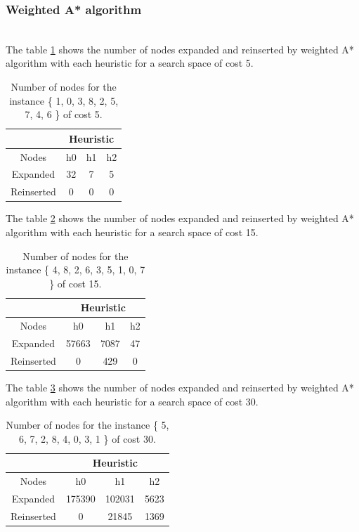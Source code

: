 \documentclass[runningheads]{llncs}
\begin{document}
\subsubsection{Weighted A* algorithm}~\\

The table \ref{tab:table4} shows the number of nodes expanded and reinserted by weighted A* algorithm with each heuristic for a search space of cost 5.
\begin{table}
    \centering
\caption{\label{tab:table4}Number of nodes for the instance \{ 1, 0, 3, 8, 2, 5, 7, 4, 6 \} of cost 5.}
    \begin{tabular}{|c|c|c|c|}
    \hline
       & \multicolumn{3}{|c|}{Heuristic} \\ \hline
        Nodes & h0 & h1 & h2 \\ \hline
        Expanded & 32 & 7 & 5 \\ \hline
        Reinserted & 0 & 0 & 0 \\ \hline
    \end{tabular}
\end{table}

The table \ref{tab:table5} shows the number of nodes expanded and reinserted by weighted A* algorithm with each heuristic for a search space of cost 15.
\begin{table}
    \centering
\caption{\label{tab:table5}Number of nodes for the instance \{ 4, 8, 2, 6, 3, 5, 1, 0, 7 \} of cost 15.}
    \begin{tabular}{|c|c|c|c|}
    \hline
       & \multicolumn{3}{|c|}{Heuristic} \\ \hline
        Nodes & h0 & h1 & h2 \\ \hline
        Expanded & 57663 & 7087 & 47 \\ \hline
        Reinserted & 0 & 429 & 0 \\ \hline
    \end{tabular}
\end{table}

The table \ref{tab:table6} shows the number of nodes expanded and reinserted by weighted A* algorithm with each heuristic for a search space of cost 30.
\begin{table}
    \centering
\caption{\label{tab:table6}Number of nodes for the instance \{ 5, 6, 7, 2, 8, 4, 0, 3, 1 \} of cost 30.}
    \begin{tabular}{|c|c|c|c|}
    \hline
       & \multicolumn{3}{|c|}{Heuristic} \\ \hline
        Nodes & h0 & h1 & h2 \\ \hline
        Expanded & 175390 & 102031 & 5623 \\ \hline
        Reinserted & 0 & 21845 & 1369 \\ \hline
    \end{tabular}
\end{table}
\end{document}
